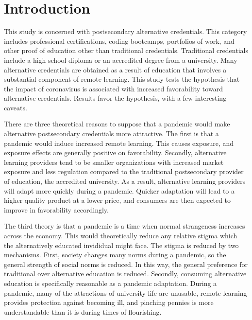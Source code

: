 \documentclass[review]{elsarticle}
\begin{document}
\pagebreak
\linenumbers

\section{Introduction}

This study is concerned with postsecondary alternative credentials.
This category includes professional certifications, coding bootcamps, portfolios of work, and other proof of education other than traditional credentials.
Traditional credentials include a high school diploma or an accredited degree from a university.
Many alternative credentials are obtained as a result of education that involves a substantial component of remote learning.
This study tests the hypothesis that the impact of coronavirus is associated with increased favorability toward alternative credentials.
Results favor the hypothesis, with a few interesting caveats.

There are three theoretical reasons to suppose that a pandemic would make alternative postsecondary credentials more attractive.
The first is that a pandemic would induce increased remote learning.
This causes exposure, and exposure effects are generally positive on favorability.
Secondly, alternative learning providers tend to be smaller organizations with increased market exposure and less regulation
compared to the traditional postsecondary provider of education, the accredited university.
As a result, alternative learning providers will adapt more quickly during a pandemic.
Quicker adaptation will lead to a higher quality product at a lower price, and consumers are then expected to improve in favorability accordingly.

The third theory is that a pandemic is a time when normal strangeness increases across the economy.
This would theoretically reduce any relative stigma which the alternatively educated invididual might face.
The stigma is reduced by two mechanisms.
First, society changes many norms during a pandemic, so the general strength of social norms is reduced.
In this way, the general preference for traditional over alternative education is reduced.
Secondly, consuming alternative education is specifically reasonable as a pandemic adaptation.
During a pandemic, many of the attractions of university life are unusable,
remote learning provides protection against becoming ill,
and pinching pennies is more understandable than it is during times of flourishing.
\end{document}
